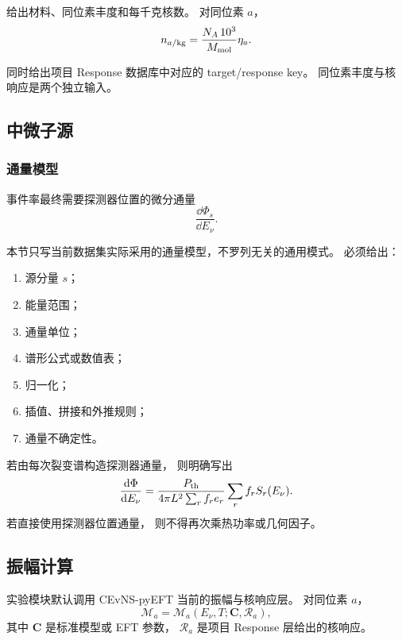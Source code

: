 给出材料、同位素丰度和每千克核数。
对同位素 $a$，
\begin{equation}
  n_{a/{\rm kg}}
  =
  \frac{N_A\,10^3}{M_{\rm mol}}\eta_a.
\end{equation}

同时给出项目 Response 数据库中对应的 target/response key。
同位素丰度与核响应是两个独立输入。

\subsection{中微子源}

\subsubsection{通量模型}

事件率最终需要探测器位置的微分通量
\begin{equation}
  \frac{\dd\Phi_s}{\dd E_\nu}.
\end{equation}

本节只写当前数据集实际采用的通量模型，不罗列无关的通用模式。
必须给出：
\begin{enumerate}
  \item 源分量 $s$；
  \item 能量范围；
  \item 通量单位；
  \item 谱形公式或数值表；
  \item 归一化；
  \item 插值、拼接和外推规则；
  \item 通量不确定性。
\end{enumerate}

若由每次裂变谱构造探测器通量，
则明确写出
\begin{equation}
  \frac{\mathrm d\Phi}{\mathrm d E_\nu}
  =
  \frac{P_{\rm th}}
  {4\pi L^2\sum_r f_re_r}
  \sum_r f_rS_r(E_\nu).
\end{equation}
若直接使用探测器位置通量，
则不得再次乘热功率或几何因子。

\subsection{振幅计算}

实验模块默认调用 CEvNS-pyEFT 当前的振幅与核响应层。
对同位素 $a$，
\begin{equation}
  \mathcal M_a
  =
  \mathcal M_a
  \left(
    E_\nu,T;
    \boldsymbol C,
    \mathcal R_a
  \right),
\end{equation}
其中 $\boldsymbol C$ 是标准模型或 EFT 参数，
$\mathcal R_a$ 是项目 Response 层给出的核响应。

